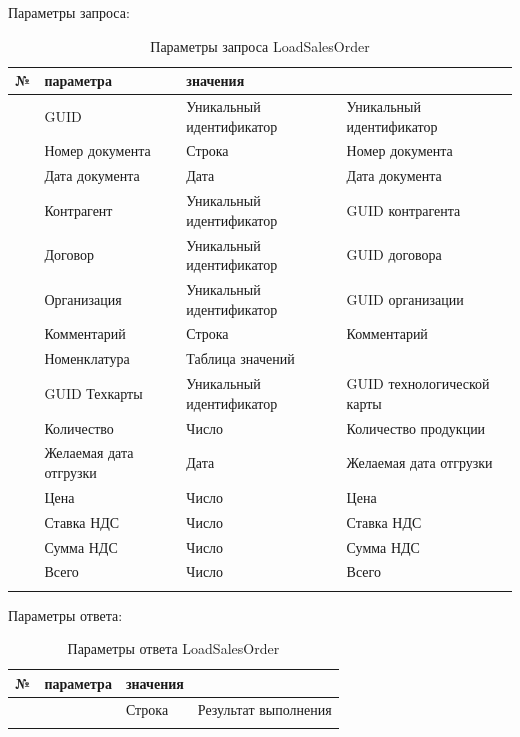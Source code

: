 Параметры запроса:
\pc
\scriptsize
\begin{longtable}{|p{10mm}|p{35mm}|p{40mm}|p{60mm}|}
\hline
\parbox[c][5mm]{10mm}{\centering№} & \parbox[c]{35mm}{ параметра} & \parbox[c]{40mm}{ значения} & \parbox[c]{60mm}{} \\
\hline
\parbox[c][5mm]{16mm}{\p} & GUID & Уникальный идентификатор & Уникальный идентификатор \\
\hline
\parbox[c][5mm]{11mm}{\p} & Номер документа & Строка & Номер документа \\
\hline
\parbox[c][5mm]{11mm}{\p} & Дата документа & Дата & Дата документа \\
\hline
\parbox[c][5mm]{11mm}{\p} & Контрагент & Уникальный идентификатор & GUID контрагента \\
\hline
\parbox[c][5mm]{11mm}{\p} & Договор &  Уникальный идентификатор  & GUID договора \\
\hline
\parbox[c][5mm]{11mm}{\p} & Организация & Уникальный идентификатор & GUID организации \\
\hline
\parbox[c][5mm]{11mm}{\p} & Комментарий & Строка & Комментарий \\
\hline
\parbox[c][5mm]{11mm}{\p} & Номенклатура & Таблица значений & \\
\hline
\parbox[c][5mm]{11mm}{} & GUID Техкарты & Уникальный идентификатор   & GUID технологической карты \\
\parbox[c][5mm]{11mm}{} & Количество & Число & Количество продукции \\
\parbox[c][5mm]{11mm}{} & Желаемая дата отгрузки & Дата & Желаемая дата отгрузки \\
\parbox[c][5mm]{11mm}{} & Цена & Число & Цена \\
\parbox[c][5mm]{11mm}{} &  Ставка НДС & Число & Ставка НДС \\
\parbox[c][5mm]{11mm}{} & Сумма НДС & Число & Сумма НДС \\
\parbox[c][5mm]{11mm}{} & Всего & Число & Всего \\
\hline
\caption{Параметры запроса LoadSalesOrder}\label{ex:in_LoadSalesOrder}
\end{longtable}  
\normalsize



 
Параметры ответа:
\pc
\scriptsize
\begin{longtable}{|p{10mm}|p{40mm}|p{20mm}|p{75mm}|}
\hline
\parbox[c][5mm]{10mm}{\centering№} & \parbox[c]{40mm}{ параметра} & \parbox[c]{20mm}{ значения} & \parbox[c]{75mm}{} \\
\hline
\parbox[c][5mm]{15mm}{\p} & \parbox[c]{30mm}{} & \parbox[c]{50mm}{Строка}  & \parbox[c]{75mm}{Результат выполнения} \\
\hline
\caption{Параметры ответа LoadSalesOrder}\label{ex:out_LoadSalesOrder}
\end{longtable}  
\normalsize





